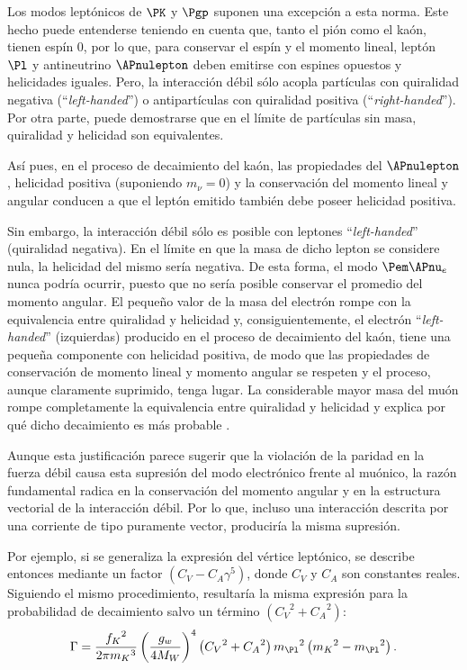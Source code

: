 Los modos leptónicos de $\PK$ y $\Pgp$ suponen una excepción a esta norma. Este hecho puede entenderse teniendo en cuenta que, tanto el pión como el kaón, tienen espín 0, por lo que, para conservar el espín y el momento lineal, leptón $\Pl$ y antineutrino $\APnulepton$ deben emitirse con espines opuestos y helicidades iguales. Pero, la interacción débil sólo acopla partículas con quiralidad negativa (``\textit{left-handed}'') o antipartículas con quiralidad positiva (``\textit{right-handed}''). Por otra parte, puede demostrarse que en el límite de partículas sin masa, quiralidad y helicidad son equivalentes.\protect\footnotemark


Así pues, en el proceso de decaimiento del kaón, las propiedades del $\APnulepton$, helicidad positiva (suponiendo $m_{\nu}=0$) y la conservación del momento lineal y angular conducen a que el leptón emitido también debe poseer helicidad positiva.

Sin embargo, la interacción débil sólo es posible con leptones ``\textit{left-handed}'' (quiralidad negativa). En el límite en que la masa de dicho lepton se considere nula, la helicidad del mismo sería negativa. De esta forma, el modo $\Pem \APnu_{e}$ nunca podría ocurrir, puesto que no sería posible conservar el promedio del momento angular. El pequeño valor de la masa del electrón rompe con la equivalencia entre quiralidad y helicidad y, consiguientemente, el electrón ``\textit{left-handed}'' (izquierdas) producido en el proceso de decaimiento del kaón, tiene una pequeña componente con helicidad positiva, de modo que las propiedades de conservación de momento lineal y momento angular se respeten y el proceso, aunque claramente suprimido, tenga lugar. La considerable mayor masa del muón rompe completamente la equivalencia entre quiralidad y helicidad y explica por qué dicho decaimiento es más probable \cite{Griffiths2008} \cite{Halzen}.

Aunque esta justificación parece sugerir que la violación de la paridad en la fuerza débil causa esta supresión del modo electrónico frente al muónico, la razón fundamental radica en la conservación del momento angular y en la estructura vectorial de la interacción débil. Por lo que, incluso una interacción descrita por una corriente de tipo puramente vector, produciría la misma supresión. 

Por ejemplo, si se generaliza la expresión del vértice leptónico, se describe entonces mediante un factor $\left( C_{V}-C_{A}\gamma^{5} \right)$, donde $C_{V}$ y $C_{A}$ son constantes reales. Siguiendo el mismo procedimiento, resultaría la misma expresión para la probabilidad de decaimiento salvo un término $\left( {C_{V}}^2+{C_{A}}^2\right)$:
\begin{equation}
\Gamma =\dfrac{{f_{K}}^{2}}{2\pi {m_{K}}^{3}}\left( \dfrac{g_w}{4M_W}\right)^{4}\left( {C_{V}}^2+{C_{A}}^2\right){m_{\Pl}}^{2}\left({m_{K}}^{2}-{m_{\Pl}}^{2}\right) .\label{eq:decayrateEWt}
\end{equation}

